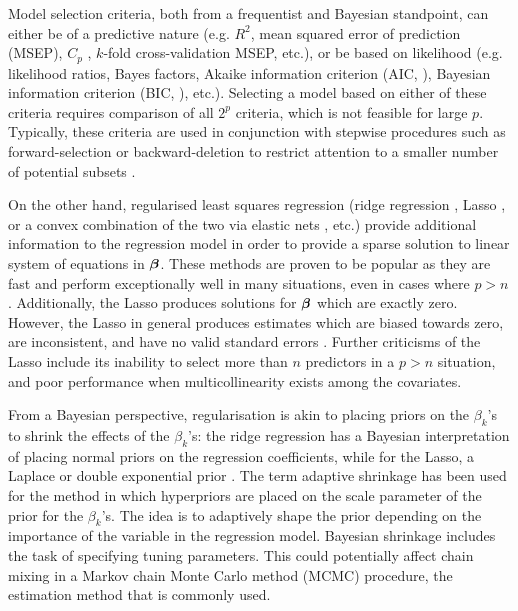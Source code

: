 \documentclass[11pt,twoside,openright]{report}
\begin{document}
Model selection criteria, both from a frequentist and Bayesian standpoint, can either be of a predictive nature (e.g.  $R^2$, mean squared error of prediction (MSEP), $C_p$ \citep{mallows1973some}, $k$-fold cross-validation MSEP, etc.), or be based on likelihood (e.g. likelihood ratios, Bayes factors, Akaike information criterion (AIC, \cite{akaike1973}), Bayesian information criterion (BIC, \cite{schwarz1978estimating}), etc.).
Selecting a model based on either of these criteria requires comparison of all $2^p$ criteria, which is not feasible for large $p$.
Typically, these criteria are used in conjunction with stepwise procedures such as forward-selection or backward-deletion to restrict attention to a smaller number of potential subsets \citep{George1993,miller2002subset}.

On the other hand, regularised least squares regression (ridge regression \citep{hoerl1970ridge}, Lasso \citep{tibshirani1996regression}, or a convex combination of the two via elastic nets \citep{zou2005regularization}, etc.) provide additional information to the regression model in order to provide a sparse solution to linear system of equations in ${\bm\beta}$.
These methods are proven to be popular as they are fast and perform exceptionally well in many situations, even in cases where $p > n$.
Additionally, the Lasso produces solutions for ${\bm\beta}$ which are exactly zero.
However, the Lasso in general produces estimates which are biased towards zero, are inconsistent, and have no valid standard errors \citep{friedman2001elements,kyung2010penalized}.
Further criticisms of the Lasso include its inability to select more than $n$ predictors in a $p>n$ situation, and poor performance when multicollinearity exists among the covariates.

From a Bayesian perspective, regularisation is akin to placing priors on the $\beta_k$'s to shrink the effects of the $\beta_k$'s: the ridge regression has a Bayesian interpretation of placing normal priors on the regression coefficients, while for the Lasso, a Laplace or double exponential prior \citep{park2008bayesian}.
The term adaptive shrinkage has been used for the method in which hyperpriors are placed on the scale parameter of the prior for the $\beta_k$'s.
The idea is to adaptively shape the prior depending on the importance of the variable in the regression model.
Bayesian shrinkage includes the task of specifying tuning parameters. 
This could potentially affect chain mixing in a Markov chain Monte Carlo method (MCMC) procedure, the estimation method that is commonly used.
\end{document}
